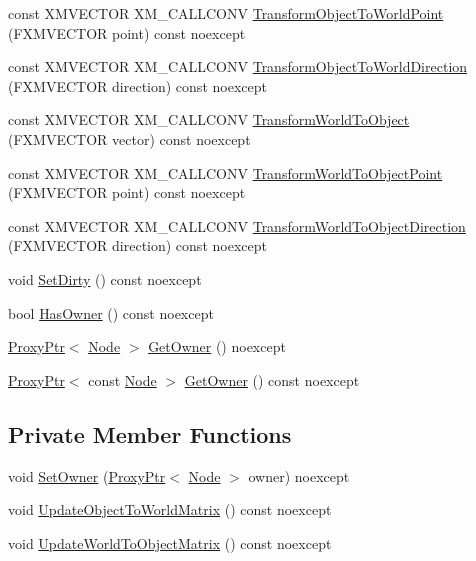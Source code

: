 \begin{DoxyCompactItemize}
\item 
const X\+M\+V\+E\+C\+T\+OR X\+M\+\_\+\+C\+A\+L\+L\+C\+O\+NV \hyperlink{classmage_1_1_transform_ae6a1911525810251aeb563b296f354d6}{Transform\+Object\+To\+World\+Point} (F\+X\+M\+V\+E\+C\+T\+OR point) const noexcept
\item 
const X\+M\+V\+E\+C\+T\+OR X\+M\+\_\+\+C\+A\+L\+L\+C\+O\+NV \hyperlink{classmage_1_1_transform_ae2bd913d2092e4f41cf65072b49df4d7}{Transform\+Object\+To\+World\+Direction} (F\+X\+M\+V\+E\+C\+T\+OR direction) const noexcept
\item 
const X\+M\+V\+E\+C\+T\+OR X\+M\+\_\+\+C\+A\+L\+L\+C\+O\+NV \hyperlink{classmage_1_1_transform_adc0ce8b6fa55d289b5354d21b3e96486}{Transform\+World\+To\+Object} (F\+X\+M\+V\+E\+C\+T\+OR vector) const noexcept
\item 
const X\+M\+V\+E\+C\+T\+OR X\+M\+\_\+\+C\+A\+L\+L\+C\+O\+NV \hyperlink{classmage_1_1_transform_af4d6c69cbf207632ded7c33446c5ee91}{Transform\+World\+To\+Object\+Point} (F\+X\+M\+V\+E\+C\+T\+OR point) const noexcept
\item 
const X\+M\+V\+E\+C\+T\+OR X\+M\+\_\+\+C\+A\+L\+L\+C\+O\+NV \hyperlink{classmage_1_1_transform_a5f7294e796fa370e44c6ca055638ffde}{Transform\+World\+To\+Object\+Direction} (F\+X\+M\+V\+E\+C\+T\+OR direction) const noexcept
\item 
void \hyperlink{classmage_1_1_transform_a8d760d79f5ad68377706234b8575e429}{Set\+Dirty} () const noexcept
\item 
bool \hyperlink{classmage_1_1_transform_ac24796b2d6179c1488410d36afdf6b68}{Has\+Owner} () const noexcept
\item 
\hyperlink{classmage_1_1_proxy_ptr}{Proxy\+Ptr}$<$ \hyperlink{classmage_1_1_node}{Node} $>$ \hyperlink{classmage_1_1_transform_afc6a2f11abb7d13de831f2c78470dc04}{Get\+Owner} () noexcept
\item 
\hyperlink{classmage_1_1_proxy_ptr}{Proxy\+Ptr}$<$ const \hyperlink{classmage_1_1_node}{Node} $>$ \hyperlink{classmage_1_1_transform_a90132f710e641238f3a988ffdbcc1a8b}{Get\+Owner} () const noexcept
\end{DoxyCompactItemize}
\subsection*{Private Member Functions}
\begin{DoxyCompactItemize}
\item 
void \hyperlink{classmage_1_1_transform_a6bc2db67891b193375d5b79cab4c223a}{Set\+Owner} (\hyperlink{classmage_1_1_proxy_ptr}{Proxy\+Ptr}$<$ \hyperlink{classmage_1_1_node}{Node} $>$ owner) noexcept
\item 
void \hyperlink{classmage_1_1_transform_a237fb0afa443909983e83f2e3863f4dd}{Update\+Object\+To\+World\+Matrix} () const noexcept
\item 
void \hyperlink{classmage_1_1_transform_a0cdac8ab1ae9570e6829fd88365df031}{Update\+World\+To\+Object\+Matrix} () const noexcept
\end{DoxyCompactItemize}
